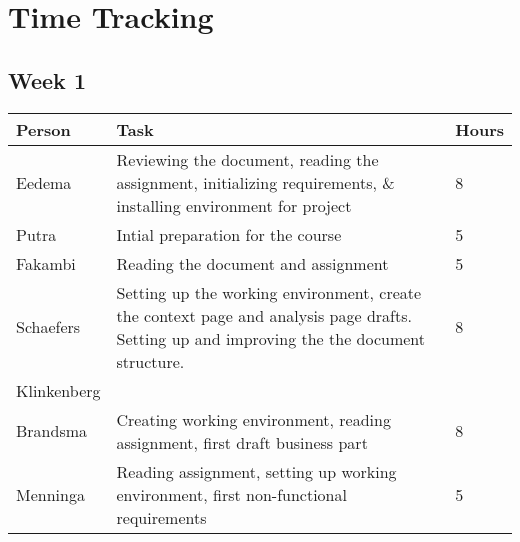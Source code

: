\chapter{Time Tracking}
\label{App: Time Tracking}


\section{Week 1}
\begin{tabular}{L{0.2\textwidth} L{0.7\textwidth} L{0.1\textwidth}}
    \textbf{Person} & \textbf{Task} & \textbf{Hours} \\ \toprule
	Eedema & Reviewing the document, reading the assignment, initializing requirements, \& installing environment for project & 8 \\ \midrule
	Putra & Intial preparation for the course & 5 \\ \midrule
	Fakambi & Reading the document and assignment & 5 \\ \midrule
	Schaefers & Setting up the working environment, create the context page and analysis page drafts. Setting up and improving the the document structure. & 8\\ \midrule
	Klinkenberg & & \\ \midrule
	Brandsma & Creating working environment, reading assignment, first draft business part & 8\\ \midrule
	Menninga & Reading assignment, setting up working environment, first non-functional requirements & 5 \\ \bottomrule
\end{tabular}

